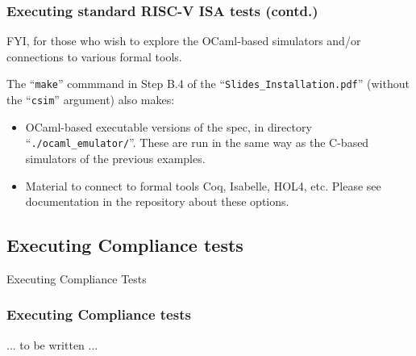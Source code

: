 \documentclass[aspectratio=169]{beamer}
\newcommand{\slidefont}{\scriptsize}
\newcommand{\cf}{\scriptsize\tt}
\begin{document}

\begin{frame}[fragile]
  \frametitle{Executing standard RISC-V ISA tests (contd.)}

  \slidefont

  FYI, for those who wish to explore the OCaml-based simulators and/or
  connections to various formal tools.

  \vspace{5ex}

  The ``{\cf make}'' commmand in Step B.4 of the
  ``{\tt Slides\_Installation.pdf}'' (without the ``{\tt csim}''
  argument) also makes:

  \begin{itemize}
    \item OCaml-based executable versions of the spec, in directory
      ``{\tt ./ocaml\_emulator/}''.  These are run in the same way as
      the C-based simulators of the previous examples.

    \item Material to connect to formal tools Coq, Isabelle, HOL4,
      etc.  Please see documentation in the repository about these
      options.

  \end{itemize}

\end{frame}


\subsection{Executing Compliance tests}


\begin{frame}[fragile]

  \slidefont

  \vfill

  \begin{center}\LARGE
    Executing Compliance Tests
  \end{center}

  \vfill

\end{frame}


\begin{frame}[fragile]
  \frametitle{Executing Compliance tests}

  ... to be written ...
\end{frame}
\end{document}
